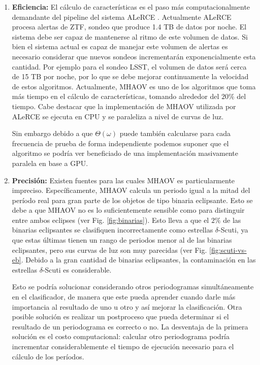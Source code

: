 \begin{enumerate}
    \item {\bf Eficiencia:} El cálculo de características es el paso más computacionalmente demandante del pipeline del sistema ALeRCE \cite{alerce-intro}. Actualmente ALeRCE procesa alertas de ZTF, sondeo que produce 1.4 TB de datos por noche. El sistema debe ser capaz de mantenerse al ritmo de este volumen de datos. Si bien el sistema actual es capaz de manejar este volumen de alertas es necesario considerar que nuevos sondeos incrementarán exponencialmente esta cantidad. Por ejemplo para el sondeo LSST, el volumen de datos será cerca de 15 TB por noche, por lo que se debe mejorar continuamente la velocidad de estos algoritmos. Actualmente, MHAOV es uno de los algoritmos que toma más tiempo en el cálculo de características, tomando alrededor del $20\%$ del tiempo. Cabe destacar que la implementación de MHAOV utilizada por ALeRCE se ejecuta en CPU y se paraleliza a nivel de curvas de luz. 
    
    Sin embargo debido a que $\Theta(\omega)$ puede también calcularse para cada frecuencia de prueba de forma independiente podemos suponer que el algoritmo se podría ver beneficiado de una implementación masivamente paralela en base a GPU.
    


    \item {\bf Precisión:} Existen fuentes para las cuales MHAOV es particularmente impreciso. Específicamente, MHAOV calcula un periodo igual a la mitad del período real para gran parte de los objetos de tipo binaria eclipsante. Esto se debe a que MHAOV no es lo suficientemente sensible como para distinguir entre ambos eclipses (ver Fig. \ref{fig:binarias}). Esto lleva a que el $2\%$ de las binarias eclipsantes se clasifiquen incorrectamente como estrellas $\delta$-Scuti, ya que estas últimas tienen un rango de periodos menor al de las binarias eclipsantes, pero sus curvas de luz son muy parecidas (ver Fig. \ref{fig:scuti-vs-eb}. Debido a la gran cantidad de binarias eclipsantes, la contaminación en las estrellas $\delta$-Scuti es considerable.

    Esto se podría solucionar considerando otros periodogramas simultáneamente en el clasificador, de manera que este pueda aprender cuando darle más importancia al resultado de uno u otro y así mejorar la clasificación. Otra posible solución es realizar un postproceso que pueda determinar si el resultado de un periodograma es correcto o no. La desventaja de la primera  solución es el costo computacional: calcular otro periodograma podría incrementar considerablemente el tiempo de ejecución necesario para el cálculo de los períodos.
\end{enumerate}


